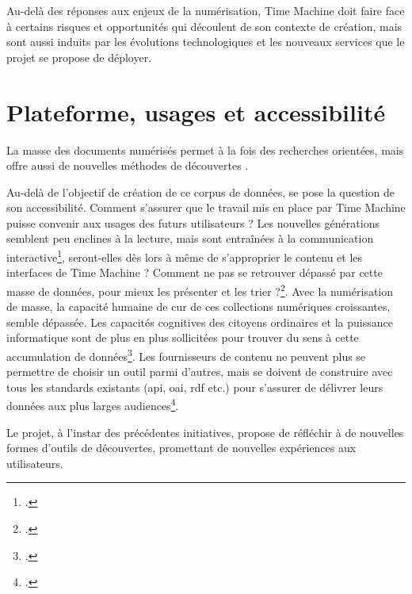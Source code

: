 Au-delà des réponses aux enjeux de la numérisation, Time Machine doit faire face à certains risques et opportunités qui découlent de son contexte de création, mais sont aussi induits par les évolutions technologiques et les nouveaux services que le projet se propose de déployer.

\section {Plateforme, usages et accessibilité}

La masse des documents numérisés permet à la fois des recherches orientées, mais offre aussi de nouvelles méthodes de découvertes . 

Au-delà de l'objectif de création de ce corpus de données, se pose la question de son accessibilité. Comment s'assurer que le travail mis en place par Time Machine puisse convenir aux usages des futurs utilisateurs ? Les nouvelles générations semblent peu enclines à la lecture, mais sont entraînées à la communication interactive\footcite{dufrene_numerisation_2013}, seront-elles dès lors à même de s'approprier le contenu et les interfaces de Time Machine ? Comment ne pas se retrouver dépassé par cette masse de données, pour mieux les présenter et les trier ?\footcite{xie_discover_2016}. Avec la numérisation de masse, la capacité humaine de \gls{cur} de ces collections numériques croissantes, semble dépassée. Les capacités cognitives des citoyens ordinaires et la puissance informatique sont de plus en plus sollicitées pour trouver du sens à cette accumulation de données\footcite{thylstrup_politics_2018}. Les fournisseurs de contenu ne peuvent plus se permettre de choisir un outil parmi d'autres, mais se doivent de construire avec tous les standards existants (\gls{api}, \gls{oai}, \gls{rdf} etc.)  pour s'assurer de délivrer leurs données aux plus larges audiences\footcite{dunning_digitising_2009}.

Le projet, à l'instar des précédentes initiatives, propose de réfléchir à de nouvelles formes d'outils de découvertes, promettant de nouvelles expériences aux utilisateurs. 

